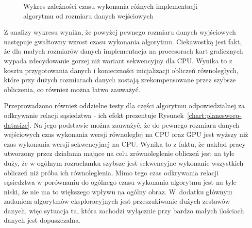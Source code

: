 \documentclass[12pt]{article}
\begin{document}
\begin{figure}[H]
\caption{Wykres zależności czasu wykonania różnych implementacji algorytmu od rozmiaru danych wejściowych}
\label{chart:datasize}
\end{figure}

Z analizy wykresu wynika, że powyżej pewnego rozmiaru danych wyjściowych następuje gwałtowny wzrost czasu wykonania algorytmu. Ciekawostką jest fakt, że dla małych rozmiarów danych implementacja na procesorach kart graficznych wypada zdecydowanie gorzej niż wariant sekwencyjny dla CPU. Wynika to z kosztu przygotowania danych i konieczności inicjalizacji obliczeń równoległych, które przy dużych rozmiarach danych zostają zrekompensowane przez szybsze obliczenia, co również można łatwo zauważyć.

Przeprowadzono również oddzielne testy dla części algorytmu odpowiedzialnej za odkrywanie relacji sąsiedztwa - ich efekt prezentuje Rysunek~\ref{chart:planesweep-datasize}. Na jego podstawie można zauważyć, że do pewnego rozmiaru danych wejściowych czas wykonania wersji równoległej na CPU oraz GPU jest wyższy niż czas wykonania wersji sekwencyjnej na CPU. Wynika to z faktu, że nakład pracy utworzony przez działania mające na celu zrównoleglenie obliczeń jest na tyle duży, że w ogólnym rozrachunku szybsze jest sekwencyjne wykonanie wszystkich obliczeń niż próba ich równoleglenia. Mimo tego czas odkrywania relacji sąsiedztwa w porównaniu do ogólnego czasu wykonania algorytmu jest na tyle niski, że nie ma to większego wpływu na ogólny obraz. W~dodatku głównym zadaniem algorytmów eksploracyjnych jest przeszukiwanie dużych zestawów danych, więc sytuacja ta, która zachodzi wyłącznie przy bardzo małych ilościach danych jest dopuszczalna.
\end{document}
